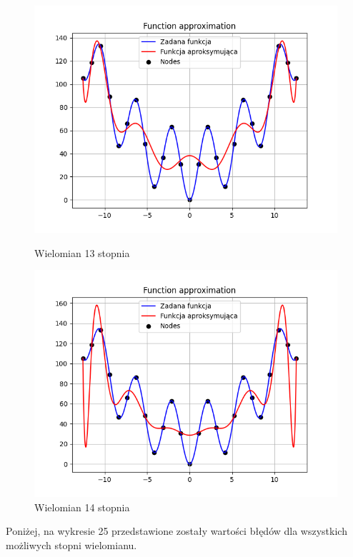 \documentclass{article}
\begin{document}
\begin{figure}[H]
\begin{minipage}[b]{0.49\textwidth}
    \begin{minipage}[b]{\textwidth}
      \includegraphics[width=\textwidth]{img23.png}
      \caption{Wielomian 13 stopnia}
    \end{minipage}
    \vspace*{\fill}
    \begin{minipage}[b]{\textwidth}
      \includegraphics[width=\textwidth]{img24.png}
      \caption{Wielomian 14 stopnia}
    \end{minipage}
  \end{minipage}
\end{figure}

Poniżej, na wykresie 25 przedstawione zostały wartości błędów dla wszystkich możliwych stopni wielomianu.
\end{document}
